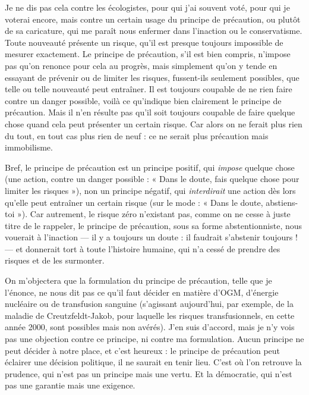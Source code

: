 Je ne dis pas cela contre les écologistes, pour qui j’ai souvent voté, pour qui
je voterai encore, mais contre un certain usage du principe de précaution, ou
plutôt de sa caricature, qui me paraît nous enfermer dans l’inaction ou le
conservatisme. Toute nouveauté présente un risque, qu’il est presque toujours
impossible de mesurer exactement. Le principe de précaution, s’il est bien compris,
n’impose pas qu’on renonce pour cela au progrès, mais simplement qu’on
y tende en essayant de prévenir ou de limiter les risques, fussent-ils seulement
possibles, que telle ou telle nouveauté peut entraîner. Il est toujours coupable
de ne rien faire contre un danger possible, voilà ce qu’indique bien clairement
le principe de précaution. Mais il n’en résulte pas qu’il soit toujours coupable
de faire quelque chose quand cela peut présenter un certain risque. Car alors on
ne ferait plus rien du tout, en tout cas plus rien de neuf : ce ne serait plus précaution
mais immobilisme.

Bref, le principe de précaution est un principe positif, qui {\it impose} quelque
chose (une action, contre un danger possible : « Dans le doute, fais quelque
chose pour limiter les risques »), non un principe négatif, qui {\it interdirait} une
action dès lors qu’elle peut entraîner un certain risque (sur le mode : « Dans le
doute, abstiens-toi »). Car autrement, le risque zéro n’existant pas, comme on
ne cesse à juste titre de le rappeler, le principe de précaution, sous sa forme abstentionniste,
nous vouerait à l’inaction — il y a toujours un doute : il faudrait
s'abstenir toujours ! — et donnerait tort à toute l’histoire humaine, qui n’a cessé
de prendre des risques et de les surmonter.

On m'objectera que la formulation du principe de précaution, telle que je
l’énonce, ne nous dit pas ce qu’il faut décider en matière d'OGM, d'énergie
nucléaire ou de transfusion sanguine (s’agissant aujourd’hui, par exemple, de la
maladie de Creutzfeldt-Jakob, pour laquelle les risques transfusionnels, en cette
année 2000, sont possibles mais non avérés). J’en suis d’accord, mais je n’y vois
pas une objection contre ce principe, ni contre ma formulation. Aucun principe
ne peut décider à notre place, et c’est heureux : le principe de précaution
peut éclairer une décision politique, il ne saurait en tenir lieu. C’est où l'on
retrouve la prudence, qui n’est pas un principe mais une vertu. Et la démocratie,
qui n’est pas une garantie mais une exigence.

